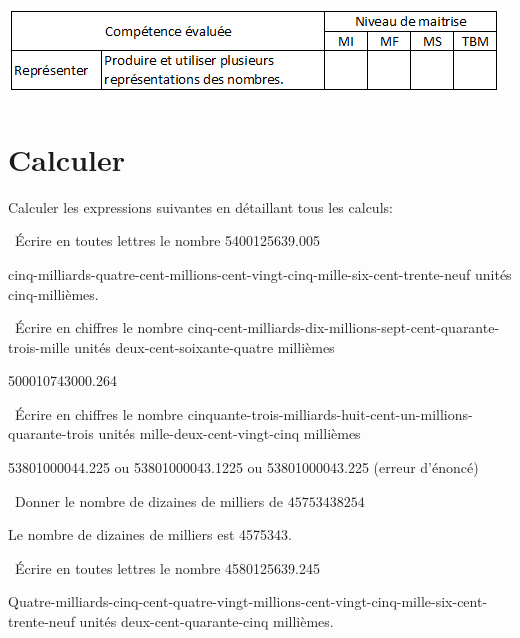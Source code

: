 	\includegraphics[scale=0.95]{competences}

\section{Calculer}
Calculer les expressions suivantes en détaillant tous les calculs:
\begin{questions}
	
	\question[1]  \'Ecrire en toutes lettres le nombre \num{5400125639.005}
	
	\begin{solution}
		cinq-milliards-quatre-cent-millions-cent-vingt-cinq-mille-six-cent-trente-neuf unités cinq-millièmes.
	\end{solution}
	
	
	\question[1]  \'Ecrire en chiffres le nombre cinq-cent-milliards-dix-millions-sept-cent-quarante-trois-mille unités deux-cent-soixante-quatre millièmes
	
	\begin{solution}
		\num{500010743000.264}
	\end{solution}
	
	\question[1]  \'Ecrire en chiffres le nombre cinquante-trois-milliards-huit-cent-un-millions-quarante-trois unités mille-deux-cent-vingt-cinq millièmes
	
	\begin{solution}
		\num{53801000044,225} ou \num{53801000043,1225} ou \num{53801000043,225} (erreur d'énoncé)
	\end{solution}
	
	\question[1]  Donner le nombre de dizaines de milliers de $\num{45753438254}$
	
	\begin{solution}
		Le nombre de dizaines de milliers est \num{4575343}.
	\end{solution}
	
	\question[1]  \'Ecrire en toutes lettres le nombre \num{4580125639.245}
	
	
	\begin{solution}
		Quatre-milliards-cinq-cent-quatre-vingt-millions-cent-vingt-cinq-mille-six-cent-trente-neuf unités deux-cent-quarante-cinq millièmes.
	\end{solution}	
	

\end{questions}

